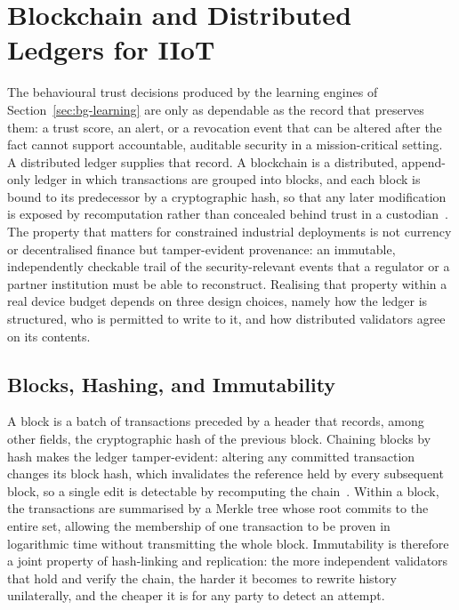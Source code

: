 \section{Blockchain and Distributed Ledgers for IIoT}
\label{sec:blockchain-ledgers}

The behavioural trust decisions produced by the learning engines of
Section~\ref{sec:bg-learning} are only as dependable as the record that
preserves them: a trust score, an alert, or a revocation event that can be
altered after the fact cannot support accountable, auditable security in a
mission-critical setting. A distributed ledger supplies that record. A
blockchain is a distributed, append-only ledger in which transactions are
grouped into blocks, and each block is bound to its predecessor by a
cryptographic hash, so that any later modification is exposed by recomputation
rather than concealed behind trust in a
custodian~\cite{xu2024exploring, savadatti2025survey}. The property that matters
for constrained industrial deployments is not currency or decentralised finance
but tamper-evident provenance: an immutable, independently checkable trail of
the security-relevant events that a regulator or a partner institution must be
able to reconstruct. Realising that property within a real device budget depends
on three design choices, namely how the ledger is structured, who is permitted
to write to it, and how distributed validators agree on its contents.

\subsection{Blocks, Hashing, and Immutability}
\label{subsec:blocks-hashing}

A block is a batch of transactions preceded by a header that records, among
other fields, the cryptographic hash of the previous block. Chaining blocks by
hash makes the ledger tamper-evident: altering any committed transaction changes
its block hash, which invalidates the reference held by every subsequent block,
so a single edit is detectable by recomputing the
chain~\cite{kuznetsov2024merkle}. Within a block, the transactions are
summarised by a Merkle tree whose root commits to the entire set, allowing the
membership of one transaction to be proven in logarithmic time without
transmitting the whole block. Immutability is therefore a joint property of
hash-linking and replication: the more independent validators that hold and
verify the chain, the harder it becomes to rewrite history unilaterally, and the
cheaper it is for any party to detect an attempt.

